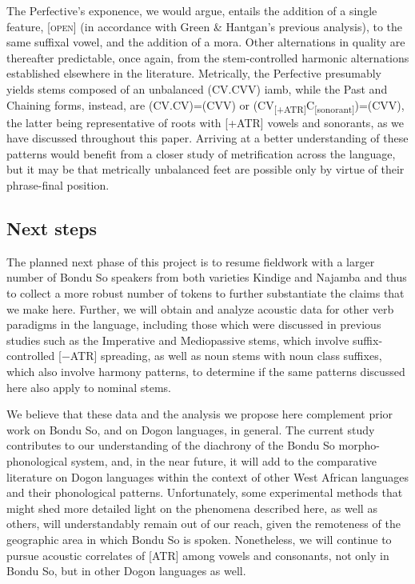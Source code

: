 \documentclass[output=paper,colorlinks,citecolor=brown]{langscibook}
\begin{document}
The Perfective's exponence, we would argue, entails the addition of a single feature, [\textsc{open}] (in accordance with Green \& Hantgan's previous analysis), to the same suffixal vowel, and the addition of a mora. Other alternations in quality are thereafter predictable, once again, from the stem-controlled harmonic alternations established elsewhere in the literature. Metrically, the Perfective presumably yields stems composed of an  unbalanced (CV.CVV) iamb, while the Past and Chaining forms, instead, are (CV.CV)=(CVV) or (CV\textsubscript{[+ATR]}C\textsubscript{[sonorant]})=(CVV), the latter being representative of roots with [+ATR] vowels and sonorants, as we have discussed throughout this paper. Arriving at a better understanding of these patterns would benefit from a closer study of metrification across the language, but it may be that metrically unbalanced feet are possible only by virtue of their phrase-final position.

\subsection{Next steps}\label{subsec-next}\largerpage

The planned next phase of this project is to resume fieldwork with a larger number of Bondu So speakers from both varieties Kindige and Najamba and thus to collect a more robust number of tokens to further substantiate the claims that we make here. Further, we will obtain and analyze acoustic data for other verb paradigms in the language, including those which were discussed in previous studies such as the Imperative and Mediopassive stems, which involve suffix-controlled [−ATR] spreading, as well as noun stems with noun class suffixes, which also involve harmony patterns, to determine if the same patterns discussed here also apply to nominal stems.

We believe that these data and the analysis we propose here complement prior work on Bondu So, and on Dogon languages, in general. The current study contributes to our understanding of the diachrony of the Bondu So morpho-phonological system, and, in the near future, it will add to the comparative literature on Dogon languages within the context of other West African languages and their phonological patterns. Unfortunately, some experimental methods that might shed more detailed light on the phenomena described here, as well as others, will understandably remain out of our reach, given the remoteness of the geographic area in which Bondu So is spoken. Nonetheless, we will continue to pursue acoustic correlates of [ATR] among vowels and consonants, not only in Bondu So, but in other Dogon languages as well.
\end{document}
